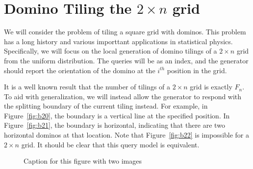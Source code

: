 \section{Domino Tiling the $2\times n$ grid}
We will consider the problem of tiling a square grid with dominos.
This problem has a long history and various importtant applications in statistical physics.
Specifically, we will focus on the local generation of domino tilings of a $2\times n$ grid from the uniform distribution.
The queries will be as an index, and the generator should report the orientation of the domino at the $i^{th}$ position in the grid.

It is a well known result  that the number of tilings of a $2\times n$ grid is exactly $F_n$.
To aid with generalization, we will instead allow the generator to respond with the splitting boundary of the current tiling instead.
For example, in Figure~\ref{fig:b20}, the boundary is a vertical line at the specified position.
In Figure~\ref{fig:b21}, the boundary is horizontal, indicating that there are two horizontal dominos at that location.
Note that Figure~\ref{fig:b22} is impossible for a $2\times n$ grid.
It should be clear that this query model is equivalent.

\begin{figure}[h]
    \centering

    \caption{Caption for this figure with two images}
    \label{fig:boundary2}
\end{figure}


